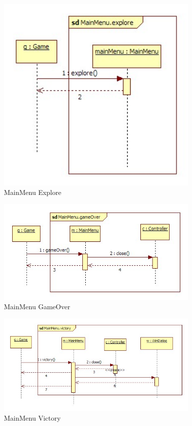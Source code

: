 \begin{figure}[H]
	\begin{center}
		\includegraphics[width=10cm]{chapters/chapter11/seq/MainMenu_explore.jpg}
		\caption{MainMenu Explore}
		\label{MainMenu Explore}
	\end{center}
\end{figure}
\begin{figure}[H]
	\begin{center}
		\includegraphics[width=10cm]{chapters/chapter11/seq/MainMenu_gameOver.jpg}
		\caption{MainMenu GameOver}
		\label{MainMenu GameOver}
	\end{center}
\end{figure}
\begin{figure}[H]
	\begin{center}
		\includegraphics[width=10cm]{chapters/chapter11/seq/MainMenu_victory.jpg}
		\caption{MainMenu Victory}
		\label{MainMenu Victory}
	\end{center}
\end{figure}
